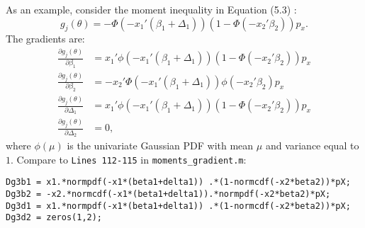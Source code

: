 \documentclass[12pt]{article}
\def\code#1{\texttt{#1}}
\begin{document}
As an example, consider the moment inequality in Equation (5.3) :
\[
g_j(\theta) = - \Phi(-x_1'(\beta_1 + \Delta_1))(1- \Phi(-x_2'\beta_2))p_x.
\]
The gradients are:
\begin{align*}
\frac{\partial g_j(\theta)}{\partial \beta_1} & = x_1' \phi(-x_1'(\beta_1 + \Delta_1))(1-\Phi(-x_2'\beta_2))p_x \\
\frac{\partial g_j(\theta)}{\partial \beta_2} & = -x_2' \Phi(-x_1'(\beta_1 + \Delta_1))\phi(-x_2'\beta_2)p_x \\
\frac{\partial g_j(\theta)}{\partial \Delta_1} & = x_1' \phi(-x_1'(\beta_1 + \Delta_1))(1-\Phi(-x_2'\beta_2))p_x \\
\frac{\partial g_j(\theta)}{\partial \Delta_2} & =0,
\end{align*}
where $\phi(\mu)$ is the univariate Gaussian PDF with mean $\mu$ and variance equal to $1$. Compare to \code{Lines 112-115} in \code{moments\_gradient.m}:
\footnotesize
    \begin{lstlisting}[backgroundcolor = \color{gray!30},
                   xleftmargin = 0cm,
                   framexleftmargin = 1em]
Dg3b1 = x1.*normpdf(-x1*(beta1+delta1)) .*(1-normcdf(-x2*beta2))*pX;
Dg3b2 = -x2.*normcdf(-x1*(beta1+delta1)).*normpdf(-x2*beta2)*pX;
Dg3d1 = x1.*normpdf(-x1*(beta1+delta1)) .*(1-normcdf(-x2*beta2))*pX;
Dg3d2 = zeros(1,2);
    \end{lstlisting}\normalsize
\end{document}
